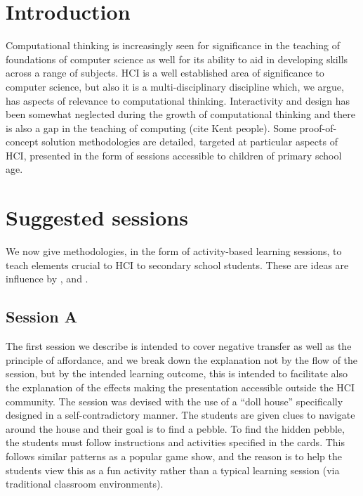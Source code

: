 \documentclass{sig-alternate}
\begin{document}
\section{Introduction}

Computational thinking is increasingly seen for significance in the
teaching of foundations of computer science as well for its ability to
aid in developing skills across a range of subjects.  HCI is a well
established area of significance to computer science, but also it is a
multi-disciplinary discipline which, we argue, has aspects of
relevance to computational thinking. Interactivity and design has been
somewhat neglected during the growth of computational thinking and
there is also a gap in the teaching of computing (cite Kent
people). Some proof-of-concept solution methodologies are detailed,
targeted at particular aspects of HCI, presented in the form of
sessions accessible to children of primary school age.

\section{Suggested sessions}

We now give methodologies, in the form of activity-based learning
sessions, to teach elements crucial to HCI to secondary school
students. These are ideas are influence by \cite{normanDesign},
\cite{rogers2011interaction} and \cite{shneiderman1986designing}.

\subsection{Session A}

The first session we describe is intended to cover negative transfer
as well as the principle of affordance, and we break down the
explanation not by the flow of the session, but by the intended
learning outcome, this is intended to facilitate also the explanation
of the effects making the presentation accessible outside the HCI
community. The session was devised with the use of a ``doll house''
specifically designed in a self-contradictory manner. The students are
given clues to navigate around the house and their goal is to find a
pebble. To find the hidden pebble, the students must follow
instructions and activities specified in the cards. This follows
similar patterns as a popular game show, and the reason is to help the
students view this as a fun activity rather than a typical learning
session (via traditional classroom environments).
\end{document}
